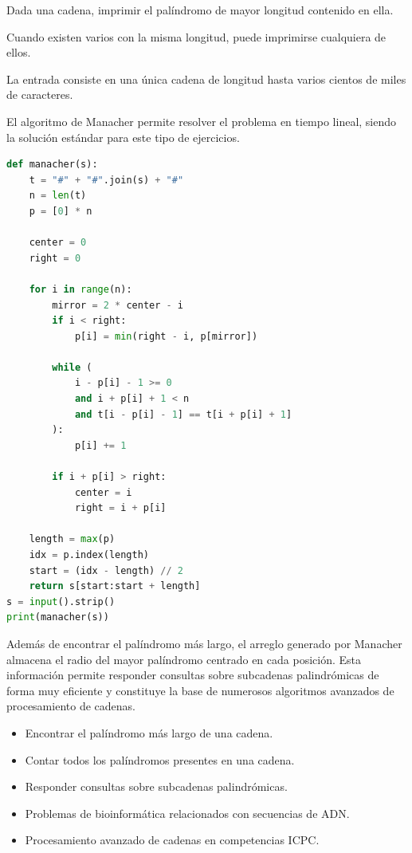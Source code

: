 Dada una cadena, imprimir el palíndromo de mayor longitud contenido en ella.

Cuando existen varios con la misma longitud, puede imprimirse cualquiera de ellos.


La entrada consiste en una única cadena de longitud hasta varios cientos de miles de caracteres.

El algoritmo de Manacher permite resolver el problema en tiempo lineal, siendo la solución estándar para este tipo de ejercicios.


\begin{lstlisting}[language=Python]
def manacher(s):
    t = "#" + "#".join(s) + "#"
    n = len(t)
    p = [0] * n

    center = 0
    right = 0

    for i in range(n):
        mirror = 2 * center - i
        if i < right:
            p[i] = min(right - i, p[mirror])

        while (
            i - p[i] - 1 >= 0
            and i + p[i] + 1 < n
            and t[i - p[i] - 1] == t[i + p[i] + 1]
        ):
            p[i] += 1

        if i + p[i] > right:
            center = i
            right = i + p[i]

    length = max(p)
    idx = p.index(length)
    start = (idx - length) // 2
    return s[start:start + length]
s = input().strip()
print(manacher(s))
\end{lstlisting}


Además de encontrar el palíndromo más largo, el arreglo generado por Manacher almacena el radio del mayor palíndromo centrado en cada posición. Esta información permite responder consultas sobre subcadenas palindrómicas de forma muy eficiente y constituye la base de numerosos algoritmos avanzados de procesamiento de cadenas.


\begin{itemize}
\item Encontrar el palíndromo más largo de una cadena.
\item Contar todos los palíndromos presentes en una cadena.
\item Responder consultas sobre subcadenas palindrómicas.
\item Problemas de bioinformática relacionados con secuencias de ADN.
\item Procesamiento avanzado de cadenas en competencias ICPC.
\end{itemize}